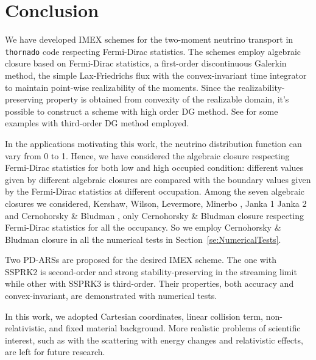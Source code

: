 \section{Conclusion}\label{se:Conclusion}

We have developed IMEX schemes for the two-moment neutrino transport in \texttt{thornado} code respecting Fermi-Dirac statistics.
The schemes employ algebraic closure based on Fermi-Dirac statistics, a first-order discontinuous Galerkin method, the simple Lax-Friedrichs flux with the convex-invariant time integrator to maintain point-wise realizability of the moments.
Since the realizability-preserving property is obtained from convexity of the realizable domain, it's possible to construct a scheme with high order DG method.
See \cite{chu_etal_2018} for some examples with third-order DG method employed.

In the applications motivating this work, the neutrino distribution function can vary from 0 to 1.
Hence, we have considered the algebraic closure respecting Fermi-Dirac statistics for both low and high occupied condition: different values given by different algebraic closures are compared with the boundary values given by the Fermi-Dirac statistics at different occupation.
Among the seven algebraic closures we considered, Kershaw\cite{kershaw_1976}, Wilson\cite{wilson_1975,leblancWilson_1970}, Levermore\cite{levermore_1984}, Minerbo \cite{minerbo_1978}, Janka 1\cite{janka_1991} Janka 2\cite{janka_1992} and Cernohorsky \& Bludman \cite{cernohorskyBludman_1994}, only Cernohorsky \& Bludman closure respecting Fermi-Dirac statistics for all the occupancy.
So we employ Cernohorsky \& Bludman closure in all the numerical tests in Section~\ref{se:NumericalTests}.

Two PD-ARSs are proposed for the desired IMEX scheme.
The one with SSPRK2 is second-order and strong stability-preserving in the streaming limit while other with SSPRK3 is third-order.
Their properties, both accuracy and convex-invariant, are demonstrated with numerical tests.

In this work, we adopted Cartesian coordinates, linear collision term, non-relativistic, and fixed material background.
More realistic problems of scientific interest, such as with the scattering with energy changes and relativistic effects, are left for future research.